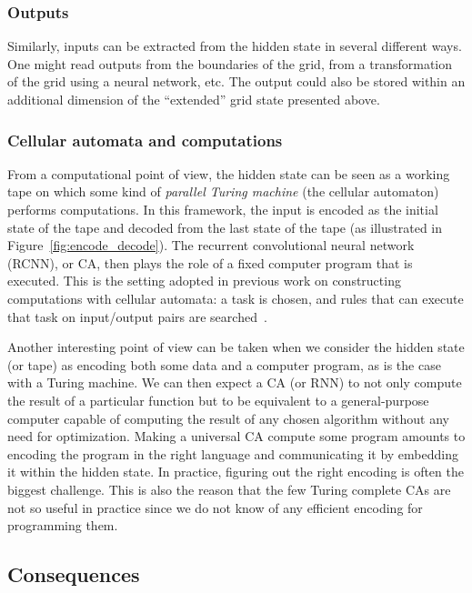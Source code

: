 \subsubsection{Outputs}

Similarly, inputs can be extracted from the hidden state in several different
ways. One might read outputs from the boundaries of the grid, from a
transformation of the grid using a neural network, etc. The output could also be
stored within an additional dimension of the ``extended'' grid state presented
above.

\subsubsection{Cellular automata and computations}

From a computational point of view, the hidden state can be seen as a working
tape on which some kind of \emph{parallel Turing machine} (the cellular automaton)
performs computations. In this framework, the input is encoded as the
initial state of the tape and decoded from the last state of the tape (as
illustrated in Figure~\ref{fig:encode_decode}). The recurrent convolutional
neural network (RCNN), or \ac{CA}, then plays the role of a fixed computer
program that is executed. This is the setting adopted in previous work on
constructing computations with cellular automata: a task is chosen, and rules that 
can execute that task on input/output pairs
are searched~\parencite{mitchellComputationCellularAutomata2005}.

Another interesting point of view can be taken when we consider the
hidden state (or tape) as encoding both some data and a computer program, as is
the case with a Turing machine. We can then expect a \ac{CA} (or \ac{RNN}) to not
only compute the result of a particular function but to be equivalent to a
general-purpose computer capable of computing the result of any chosen algorithm
without any need for optimization. Making a universal \ac{CA} compute some
program amounts to encoding the program in the right language and
communicating it by embedding it within the hidden state. In practice, figuring
out the right encoding is often the biggest challenge. This is also the reason
that the few Turing complete \acp{CA} are not so useful in practice since we do
not know of any efficient encoding for programming them.

\subsection{Consequences}


